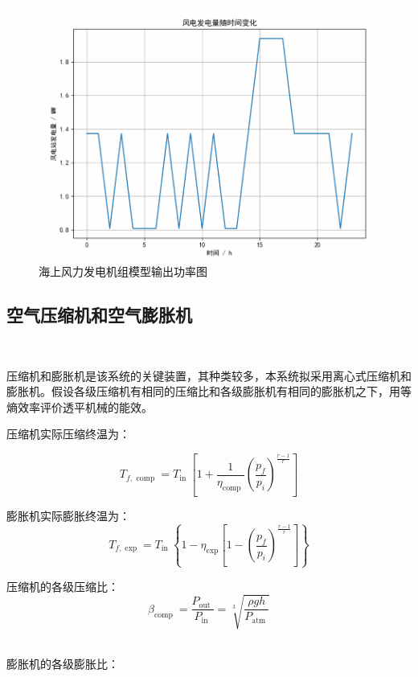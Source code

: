 \documentclass{jnuthesis}
\begin{document}
	
	\begin{figure}[H]
		\centering
		\includegraphics[width=0.7\linewidth]{pictures/screenshot002}
		\caption{\fontsize{10.5bp}{10pt}海上风力发电机组模型输出功率图}
		\label{fig:screenshot002}
	\end{figure}
	
	
	\subsection{空气压缩机和空气膨胀机}\ 
	
	压缩机和膨胀机是该系统的关键装置，其种类较多，本系统拟采用离心式压缩机和膨胀机。假设各级压缩机有相同的压缩比和各级膨胀机有相同的膨胀机之下，用等熵效率评价透平机械的能效。
	\par 压缩机实际压缩终温为：
	
	\begin{equation}
		T_{f, \text { comp }}=T_{\text {in }}\left[1+\frac{1}{\eta_{\text {comp }}}\left(\frac{p_{f}}{p_{i}}\right)^{\frac{r-1}{r}}\right]
	\end{equation}
	
	
	膨胀机实际膨胀终温为：
	\begin{equation}
		T_{f, \exp }=T_{\text {in }}\left\{1-\eta_{\exp }\left[1-\left(\frac{p_{f}}{p_{i}}\right)^{\frac{r-1}{r}}\right]\right\}
		\label{f2}
	\end{equation}
	
	
	压缩机的各级压缩比：\\
	
	\begin{equation}
		\beta_{\text {comp }}=\frac{P_{\text {out }}}{P_{\text {in }}}=\sqrt[3]{\frac{\rho g h }{P_{\text {atm }} }}
	\end{equation}\ 
	
	膨胀机的各级膨胀比：\\
	
\end{document}
